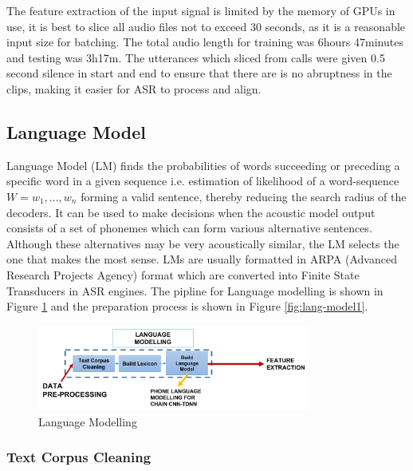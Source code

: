 \documentclass[a4paper, 11pt]{article}
\begin{document}
 
The feature extraction of the input signal is limited by the memory of GPUs in use, it is best to slice all audio files not to exceed 30 seconds, as it is a reasonable input size for batching. The total audio length for training was 6hours 47minutes and testing was 3h17m. The utterances which sliced from calls were given 0.5  second silence in start and end to ensure that there are is no abruptness in the clips, making it easier for ASR to process and align.

\subsection{Language Model}
\label{sec:our_lang_modelling}

Language Model (LM) finds the probabilities of words succeeding or preceding a specific word in a given sequence i.e. estimation of likelihood of a word-sequence $W = w_{1},...,w_{n}$ forming a valid sentence, thereby reducing the search radius of the decoders. It can be used to make decisions when the acoustic model output consists of a set of phonemes which can form various alternative sentences. Although these alternatives may be very acoustically similar, the LM selects the one that makes the most sense. LMs are usually formatted in ARPA (Advanced Research Projects Agency) format which are converted into Finite State Transducers in ASR engines. The pipline for Language modelling is shown in Figure \ref{fig:working_pipeline-2} and the preparation process is shown in Figure \ref{fig:lang-model1}. 

\begin{figure}[h]
    \centering
    \includegraphics[width=0.8\textwidth]{img/workflow-2.png}
    \caption{Language Modelling}
    \label{fig:working_pipeline-2}
\end{figure}

\subsubsection{Text Corpus Cleaning}
\end{document}
